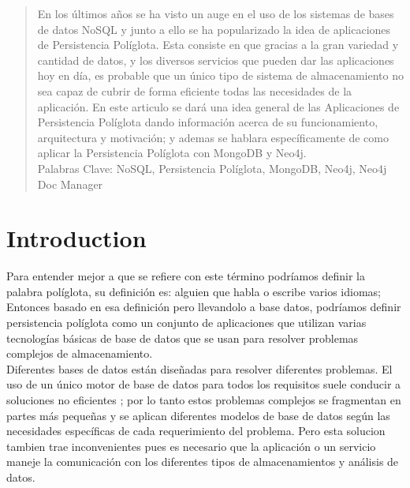 \documentclass[conference,compsoc]{IEEEtran}
\begin{document}
\begin{abstract}
En los últimos años se ha visto un auge en el uso de los sistemas de bases de datos NoSQL y junto a ello se ha popularizado la idea de aplicaciones de Persistencia Políglota. Esta consiste en que gracias a la gran variedad y cantidad de datos, y los diversos servicios que pueden dar las aplicaciones hoy en día, es probable que un único tipo de sistema de almacenamiento no sea capaz de cubrir de forma eficiente todas las necesidades de la aplicación. En este articulo se dará una idea general de las Aplicaciones de Persistencia Políglota dando información acerca de su funcionamiento, arquitectura y motivación; y ademas se hablara específicamente de como aplicar la Persistencia Políglota con MongoDB y Neo4j.
\\
Palabras Clave: NoSQL, Persistencia Políglota, MongoDB, Neo4j, Neo4j Doc Manager
\end{abstract}







%
\IEEEpeerreviewmaketitle


\section{Introduction}

Para entender mejor a que se refiere con este término podríamos definir la palabra políglota, su definición es: alguien que habla o escribe varios idiomas; Entonces basado en esa definición pero llevandolo a base datos, podríamos definir persistencia políglota como un conjunto de aplicaciones que utilizan varias tecnologías básicas de base de datos que se usan para resolver  problemas complejos de almacenamiento.
\\
Diferentes bases de datos están diseñadas para resolver diferentes problemas. El uso de un único motor de base de datos para todos los requisitos suele conducir a soluciones no eficientes \cite{art15}; por lo tanto estos problemas complejos se  fragmentan en partes más pequeñas y se aplican diferentes modelos de base de datos según las necesidades específicas de cada requerimiento del problema. Pero esta solucion tambien trae inconvenientes pues es necesario que la aplicación o un servicio maneje la comunicación con los diferentes tipos de almacenamientos y análisis de datos.
\\
\end{document}
